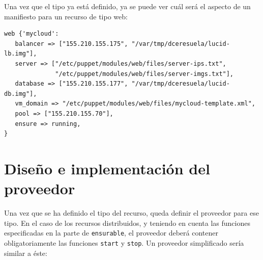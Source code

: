 Una vez que el tipo ya está definido, ya se puede ver cuál será el aspecto de un manifiesto para un recurso de tipo web:

\begin{lstlisting}
web {'mycloud':
   balancer => ["155.210.155.175", "/var/tmp/dceresuela/lucid-lb.img"],
   server => ["/etc/puppet/modules/web/files/server-ips.txt",
              "/etc/puppet/modules/web/files/server-imgs.txt"],
   database => ["155.210.155.177", "/var/tmp/dceresuela/lucid-db.img"],
   vm_domain => "/etc/puppet/modules/web/files/mycloud-template.xml",
   pool => ["155.210.155.70"],
   ensure => running,
}
\end{lstlisting}

\section{Diseño e implementación del proveedor}

Una vez que se ha definido el tipo del recurso, queda definir el proveedor para ese tipo. En el caso de los recursos distribuidos, y teniendo en cuenta las funciones especificadas en la parte de \texttt{ensurable}, el proveedor deberá contener obligatoriamente las funciones \texttt{start} y \texttt{stop}. Un proveedor simplificado sería similar a éste:

